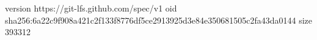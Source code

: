 version https://git-lfs.github.com/spec/v1
oid sha256:6a22c9f908a421c2f133f8776df5ce2913925d3e84e350681505c2fa43da0144
size 393312
